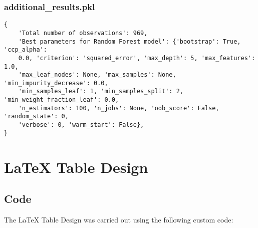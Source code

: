 \documentclass[11pt]{article}
\begin{document}
\subsubsection*{additional\_results.pkl}

\begin{Verbatim}[tabsize=4]
{
    'Total number of observations': 969,
    'Best parameters for Random Forest model': {'bootstrap': True, 'ccp_alpha':
	0.0, 'criterion': 'squared_error', 'max_depth': 5, 'max_features': 1.0,
	'max_leaf_nodes': None, 'max_samples': None, 'min_impurity_decrease': 0.0,
	'min_samples_leaf': 1, 'min_samples_split': 2, 'min_weight_fraction_leaf': 0.0,
	'n_estimators': 100, 'n_jobs': None, 'oob_score': False, 'random_state': 0,
	'verbose': 0, 'warm_start': False},
}
\end{Verbatim}

\section{LaTeX Table Design}
\subsection{{Code}}
The LaTeX Table Design was carried out using the following custom code:
\end{document}
